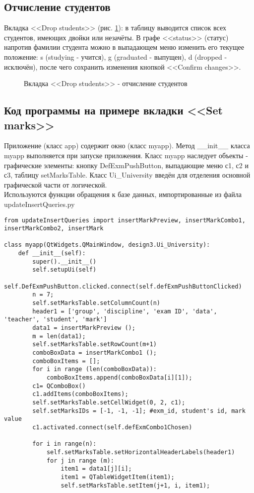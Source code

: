 \documentclass[zuevDbReport.tex]{subfiles}
\begin{document}
\newpage
\subsection{Отчисление студентов}
Вкладка <<Drop students>> (рис. \ref{dropStuds}): в таблицу выводится список всех студентов, имеющих двойки или незачёты. В графе <<status>> (статус) напротив фамилии студента можно в выпадающем меню изменить его текущее положение: s (studying - учится),  g (graduated - выпущен), d (dropped - исключён), после чего сохранить изменения кнопкой <<Confirm changes>>.
\begin{figure}[H]
\caption{Вкладка <<Drop students>> - отчисление студентов}
\label{dropStuds}
\end{figure}

\newpage
\subsection {Код программы на примере вкладки <<Set marks>>}
\label{codeExample}
Приложение (класс app) содержит окно (класс myapp). Метод \_\_init\_\_ класса myapp выполняется при запуске приложения. Класс myapp наследует объекты - графические элементы: кнопку DefExmPushButton, выпадающие меню с1, с2 и с3, таблицу setMarksTable. Класс Ui\_University введён для отделения основной графической части от логической.\\
Используются функции обращения к базе данных, импортированные из файла  updateInsertQueries.py

\begin {lstlisting}
from updateInsertQueries import insertMarkPreview, insertMarkCombo1, insertMarkCombo2, insertMark

class myapp(QtWidgets.QMainWindow, design3.Ui_University):
    def __init__(self):
        super().__init__()
        self.setupUi(self)
        self.DefExmPushButton.clicked.connect(self.defExmPushButtonClicked)
        n = 7;
        self.setMarksTable.setColumnCount(n)
        header1 = ['group', 'discipline', 'exam ID', 'data', 'teacher', 'student', 'mark']
        data1 = insertMarkPreview ();
        m = len(data1);
        self.setMarksTable.setRowCount(m+1)
        comboBoxData = insertMarkCombo1 ();
        comboBoxItems = [];
        for i in range (len(comboBoxData)):
            comboBoxItems.append(comboBoxData[i][1]);
        c1= QComboBox()
        c1.addItems(comboBoxItems);
        self.setMarksTable.setCellWidget(0, 2, c1);
        self.setMarksIDs = [-1, -1, -1]; #exm_id, student's id, mark value
        c1.activated.connect(self.defExmCombo1Chosen)
        
        for i in range(n):
            self.setMarksTable.setHorizontalHeaderLabels(header1)
            for j in range (m):
                item1 = data1[j][i];
                item1 = QTableWidgetItem(item1);
                self.setMarksTable.setItem(j+1, i, item1);
\end{lstlisting}
\end{document}
